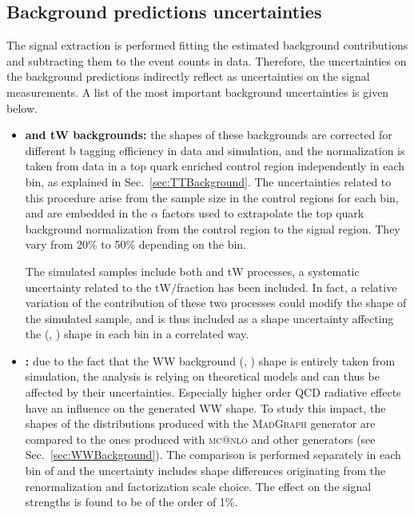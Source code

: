 \subsection{Background predictions uncertainties}

The signal extraction is performed fitting the estimated background contributions and subtracting them to the event counts in data. Therefore, the uncertainties on the background predictions indirectly reflect as uncertainties on the signal measurements. A list of the most important background uncertainties is given below.

\begin{itemize}
\item {\bf\boldmath \ttbar and tW backgrounds:}    
the shapes of these backgrounds are corrected for different b tagging efficiency in data and simulation, and the normalization is taken from data in a top quark enriched control region independently in each \pth bin, as explained in Sec.~\ref{sec:TTBackground}. The uncertainties related to this procedure arise from the sample size in the control regions for each \pth bin, and are embedded in the $\alpha$ factors used to extrapolate
the top quark background normalization from the control region to the signal region. They vary from 20\% to 50\% depending on the \pth bin.
   
The simulated samples include both \ttbar and tW processes, a systematic uncertainty related to the tW$/$\ttbar fraction has been included.
In fact, a relative variation of the contribution of these two processes could modify the shape of the simulated sample, and is thus included as a shape uncertainty affecting the (\mll, \mt) shape in each \pth bin in a correlated way. 

\item {\bf {}:} 
due to the fact that the WW background (\mll, \mt) shape is entirely taken from simulation, the analysis is relying on theoretical models and can thus be affected by their uncertainties. Especially higher order QCD radiative effects have an influence on the generated WW shape. To study this impact, the shapes of the distributions produced with the \textsc{MadGraph} generator are compared to the ones produced with \textsc{mc@nlo} and other generators (see Sec.~\ref{sec:WWBackground}). The comparison is performed separately in each bin of \pth and the uncertainty includes shape differences originating from the renormalization and factorization scale choice. The effect on the signal strengths is found to be of the order of 1\%.
  

\end{itemize}
